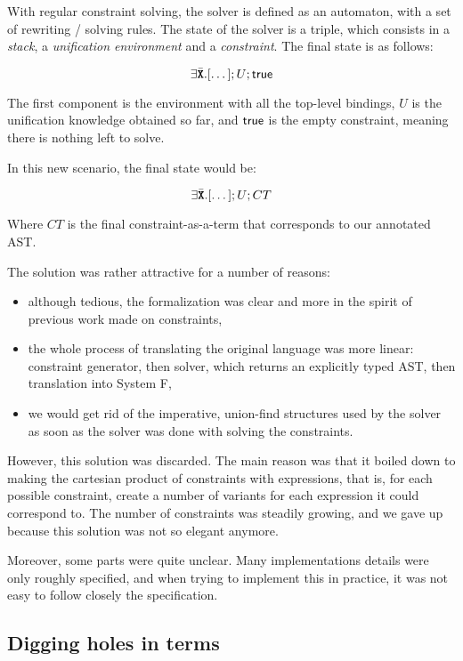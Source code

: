 \documentclass[10pt,a4paper,twoside,titlepage,twocolumn]{article}
\begin{document}
With regular constraint solving, the solver is defined as an automaton, with a
set of rewriting / solving rules. The state of the solver is a triple, which
consists in a \emph{stack}, a \emph{unification environment} and a
\emph{constraint}. The final state is as follows:

$$\exists{\bar {{\textbf{\texttt{X}}}}}.[\dots]; U; \text{\textsf{true}}$$

The first component is the environment with all the top-level bindings, $U$ is
the unification knowledge obtained so far, and $\text{\textsf{true}}$ is the empty constraint,
meaning there is nothing left to solve.

In this new scenario, the final state would be:

$$\exists{\bar {{\textbf{\texttt{X}}}}}.[\dots]; U; CT$$

Where $CT$ is the final constraint-as-a-term that corresponds to our annotated AST.

The solution was rather attractive for a number of reasons:
\begin{itemize}
  \item although tedious, the formalization was clear and more in the spirit of
    previous work made on constraints,
  \item the whole process of translating the original language was more linear:
    constraint generator, then solver, which returns an explicitly typed AST,
    then translation into System F,
  \item we would get rid of the imperative, union-find structures used by the
    solver as soon as the solver was done with solving the constraints.
\end{itemize}

However, this solution was discarded. The main reason was that it boiled down to
making the cartesian product of constraints with expressions, that is, for each
possible constraint, create a number of variants for each expression it could
correspond to. The number of constraints was steadily growing, and we gave up
because this solution was not so elegant anymore.

Moreover, some parts were quite unclear. Many implementations details were only
roughly specified, and when trying to implement this in practice, it was not
easy to follow closely the specification.

\subsection{Digging holes in terms}
\end{document}
